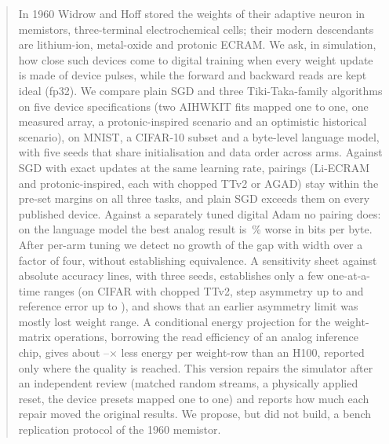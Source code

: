 \begin{abstract}
In 1960 Widrow and Hoff stored the weights of their adaptive neuron in memistors, three-terminal electrochemical cells; their
modern descendants are lithium-ion, metal-oxide and protonic ECRAM. We ask, in simulation, how close such devices come to digital
training when every weight update is made of device pulses, while the forward and backward reads are kept ideal (fp32). We compare
plain SGD and three Tiki-Taka-family algorithms on five device specifications (two AIHWKIT fits mapped one to one, one measured
array, a protonic-inspired scenario and an optimistic historical scenario), on MNIST, a CIFAR-10 subset and a byte-level language
model, with five seeds that share initialisation and data order across arms. Against SGD with exact updates at the same learning
rate, \RVAllThreeFpN{} pairings (Li-ECRAM and protonic-inspired, each with chopped TTv2 or AGAD) stay within the pre-set margins
on all three tasks, and plain SGD exceeds them on every published device. Against a separately tuned digital Adam no pairing
does: on the language model the best analog result is \RVLmAdamBestGap\,\% worse in bits per byte. After per-arm tuning we detect
no growth of the gap with width over a factor of four, without establishing equivalence. A sensitivity sheet against absolute
accuracy lines, with three seeds, establishes only a few one-at-a-time ranges (on CIFAR with chopped TTv2, step asymmetry up to
\RVSpecCttvTwoCifarAsymThr{} and reference error up to \RVSpecCttvTwoCifarRefErrThr), and shows that an earlier asymmetry limit
was mostly lost weight range. A conditional
energy projection for the weight-matrix operations, borrowing the read efficiency of an analog inference chip, gives about
\RVenSysMin--\RVenChipMax$\times$ less energy per weight-row than an H100, reported only where the quality is reached. This
version repairs the simulator after an independent review (matched random streams, a physically applied reset, the device presets
mapped one to one) and reports how much each repair moved the original results. We propose, but did not build, a bench
replication protocol of the 1960 memistor.
\end{abstract}
